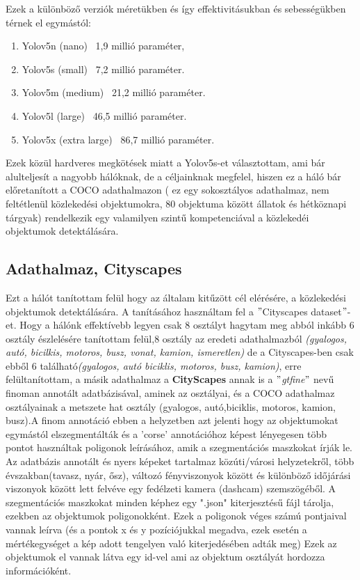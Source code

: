 \documentclass[12pt,oneside,a4paper]{article}
\theoremstyle{remark}
\begin{document}
Ezek a különböző verziók méretükben és így effektivitásukban és sebességükben térnek
el egymástól:
\vspace{2mm}
\newpage
\begin{enumerate}
\item Yolov5n (nano) ~1,9 millió paraméter,
\item Yolov5s (small) ~7,2 millió paraméter.
\item Yolov5m (medium) ~21,2 millió paraméter.
\item Yolov5l (large) ~46,5 millió paraméter.
\item Yolov5x (extra large) ~86,7 millió paraméter. \noindent
\end{enumerate}
\vspace{3mm}
\noindent Ezek közül hardveres megkötések miatt a Yolov5s-et választottam, ami bár alulteljesít a nagyobb hálóknak,
de a céljainknak megfelel, \noindent
\noindent hiszen ez a háló bár előretanított a COCO adathalmazon ( ez egy sokosztályos adathalmaz, nem feltétlenül
közlekedési objektumokra, 80 objektuma között állatok és hétköznapi tárgyak) rendelkezik egy valamilyen szintű
kompetenciával a közlekedéi objektumok detektálására.

\subsection{Adathalmaz, Cityscapes}\label{subsec:adathalmaz-cityscapes}
Ezt a hálót tanítottam felül hogy az általam kitűzött cél elérésére, a közlekedési objektumok detektálására. A tanításához használtam fel a \("\)Cityscapes dataset\("\)\cite{cityscapes}-et.
 Hogy a hálónk effektívebb legyen csak 8 osztályt hagytam meg abból inkább 6 osztály észlelésére tanítottam
 felül,8 osztály az eredeti adathalmazból \textit{(gyalogos, autó, bicilkis, motoros, busz, vonat, kamion, ismeretlen)}
de a Cityscapes-ben csak ebből 6 található\textit{(gyalogos, autó biciklis, motoros, busz, kamion)}, erre felültanítottam,
 a másik adathalmaz a \textbf{CityScapes} annak is a \("\)\textit{gtfine}\("\) nevű finoman annotált adatbázisával,
aminek az osztályai, és a COCO adathalmaz osztályainak a metszete hat osztály (gyalogos, autó,biciklis,
motoros, kamion, busz).A finom annotáció ebben a helyzetben azt jelenti hogy az objektumokat egymástól elszegmentálták
és a 'corse' annotációhoz képest lényegesen több pontot használtak poligonok leírásához, amik a szegmentációs maszkokat írják le.
Az adatbázis annotált és nyers képeket tartalmaz
 közúti/városi helyzetekről, több évszakban(tavasz, nyár, ősz), változó fényviszonyok között és különböző
időjárási viszonyok között lett felvéve egy fedélzeti kamera (dashcam) szemszögéből.
 A szegmentációs maszkokat minden képhez egy ".json" kiterjesztésű fájl tárolja, ezekben az objektumok poligonokként.
Ezek a poligonok véges számú pontjaival vannak leírva (és a pontok x és y pozíciójukkal megadva, ezek esetén a mértékegységet a kép adott
tengelyen való kiterjedésében adták meg)
Ezek az objektumok el vannak látva egy id-vel ami az objektum osztályát hordozza információként.
\end{document}
